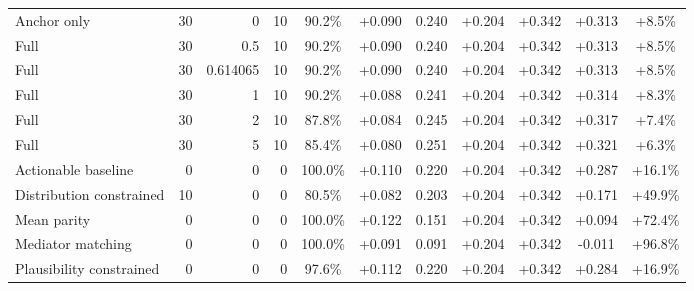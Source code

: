 \begin{table}[htbp]
\begin{tabular}{lrrrccccccc}
Anchor only & 30 & 0 & 10 & 90.2\% & +0.090 & 0.240 & +0.204 & +0.342 & +0.313 & +8.5\% \\
Full & 30 & 0.5 & 10 & 90.2\% & +0.090 & 0.240 & +0.204 & +0.342 & +0.313 & +8.5\% \\
Full & 30 & 0.614065 & 10 & 90.2\% & +0.090 & 0.240 & +0.204 & +0.342 & +0.313 & +8.5\% \\
Full & 30 & 1 & 10 & 90.2\% & +0.088 & 0.241 & +0.204 & +0.342 & +0.314 & +8.3\% \\
Full & 30 & 2 & 10 & 87.8\% & +0.084 & 0.245 & +0.204 & +0.342 & +0.317 & +7.4\% \\
Full & 30 & 5 & 10 & 85.4\% & +0.080 & 0.251 & +0.204 & +0.342 & +0.321 & +6.3\% \\
Actionable baseline & 0 & 0 & 0 & 100.0\% & +0.110 & 0.220 & +0.204 & +0.342 & +0.287 & +16.1\% \\
Distribution constrained & 10 & 0 & 0 & 80.5\% & +0.082 & 0.203 & +0.204 & +0.342 & +0.171 & +49.9\% \\
Mean parity & 0 & 0 & 0 & 100.0\% & +0.122 & 0.151 & +0.204 & +0.342 & +0.094 & +72.4\% \\
Mediator matching & 0 & 0 & 0 & 100.0\% & +0.091 & 0.091 & +0.204 & +0.342 & -0.011 & +96.8\% \\
Plausibility constrained & 0 & 0 & 0 & 97.6\% & +0.112 & 0.220 & +0.204 & +0.342 & +0.284 & +16.9\% \\
\bottomrule
\end{tabular}
\end{table}
